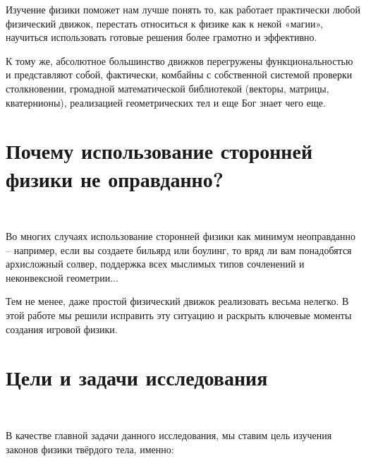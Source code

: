 Изучение физики поможет нам лучше понять то,
как работает практически любой физический движок, перестать
относиться к физике как к некой «магии», научиться
использовать готовые решения более грамотно и эффективно.

К тому же, абсолютное большинство движков перегружены 
функциональностью и представляют собой, фактически,
комбайны с собственной системой проверки столкновении,
громадной математической библиотекой (векторы, матрицы,
кватернионы), реализацией геометрических тел и еще Бог знает
чего еще. 

\section{Почему использование сторонней физики не оправданно?} 
\

Во многих случаях использование сторонней
физики как минимум неоправданно – например, если вы
создаете бильярд или боулинг, то вряд ли вам понадобятся
архисложный солвер, поддержка всех мыслимых типов
сочленений и неконвексной геометрии...%

Тем не менее, даже простой физический движок
реализовать весьма нелегко. В этой работе мы решили исправить эту
ситуацию и раскрыть ключевые моменты создания игровой физики.

\section{Цели и задачи исследования} 
\

В качестве главной задачи данного исследования, мы ставим цель
изучения законов физики твёрдого тела,  именно:

